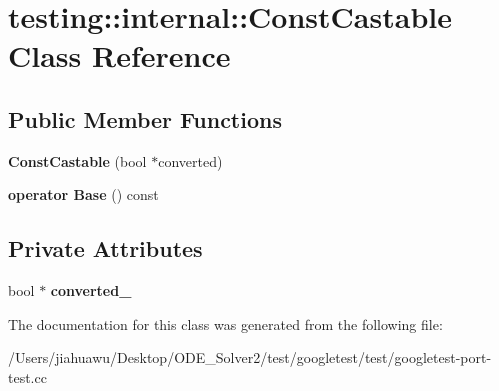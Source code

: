 \hypertarget{classtesting_1_1internal_1_1_const_castable}{}\section{testing\+:\+:internal\+:\+:Const\+Castable Class Reference}
\label{classtesting_1_1internal_1_1_const_castable}
\subsection*{Public Member Functions}
\begin{DoxyCompactItemize}
\item 
\mbox{\label{classtesting_1_1internal_1_1_const_castable_a78eba470cc71528237a33a10a92fba7e}} 
{\bfseries Const\+Castable} (bool $\ast$converted)
\item 
\mbox{\label{classtesting_1_1internal_1_1_const_castable_af084893d6786010022297b1e88f4743b}} 
{\bfseries operator Base} () const
\end{DoxyCompactItemize}
\subsection*{Private Attributes}
\begin{DoxyCompactItemize}
\item 
\mbox{\label{classtesting_1_1internal_1_1_const_castable_afd56f08fe3748a6223b62bceb585ab6a}} 
bool $\ast$ {\bfseries converted\+\_\+}
\end{DoxyCompactItemize}


The documentation for this class was generated from the following file\+:\begin{DoxyCompactItemize}
\item 
/\+Users/jiahuawu/\+Desktop/\+O\+D\+E\+\_\+\+Solver2/test/googletest/test/googletest-\/port-\/test.\+cc\end{DoxyCompactItemize}
